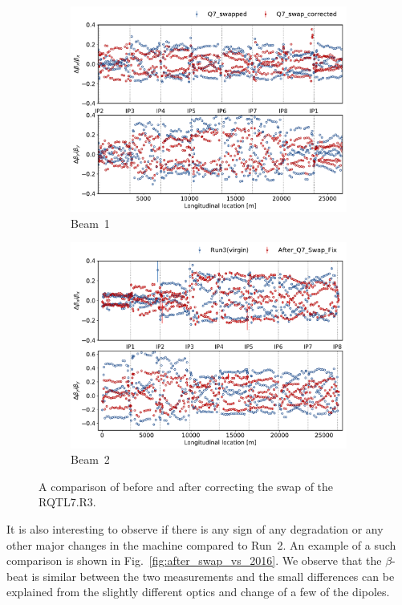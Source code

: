 \documentclass[a4paper]{cernatsnote}
\begin{document}
\begin{figure}[ht]
\begin{subfigure}{.5\textwidth}
  \centering
  \includegraphics[width=.8\linewidth]{plots/beam1/beta_beat_before_after_swap.pdf}  
  \caption{Beam~1}
\end{subfigure}
\begin{subfigure}{.5\textwidth}
  \centering
  \includegraphics[width=.8\linewidth]{plots/beam2/beta_beat_before_vs_after_Q7_swap.pdf}  
  \caption{Beam~2}
\end{subfigure}
\caption{A comparison of before and after correcting the swap of the RQTL7.R3.}
\label{fig:before_after_swap}
\end{figure}

It is also interesting to observe if there is any sign of any degradation or any other major changes in the machine compared to Run~2. An example of a such comparison is shown in Fig.~\ref{fig:after_swap_vs_2016}. We observe that the $\beta$-beat is similar between the two measurements and the small differences can be explained from the slightly different optics and change of a few of the dipoles. 
\end{document}
